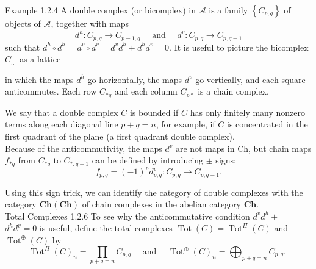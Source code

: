 Example 1.2.4 A double complex (or bicomplex) in $\mathcal{A}$ is a family $\left\{C_{p, q}\right\}$ of objects of $\mathcal{A}$, together with maps
$$
d^h: C_{p, q} \rightarrow C_{p-1, q} \quad \text { and } \quad d^v: C_{p, q} \rightarrow C_{p, q-1}
$$
such that $d^h \circ d^h=d^v \circ d^v=d^v d^h+d^h d^v=0$. It is useful to picture the bicomplex $C_{\text {.. }}$ as a lattice 
    in which the maps $d^h$ go horizontally, the maps $d^v$ go vertically, and each square anticommutes. Each row $C_{* q}$ and each column $C_{p *}$ is a chain complex.

We say that a double complex $C$ is bounded if $C$ has only finitely many nonzero terms along each diagonal line $p+q=n$, for example, if $C$ is concentrated in the first quadrant of the plane (a first quadrant double complex).\\
Because of the anticommutivity, the maps $d^v$ are not maps in Ch, but chain maps $f_{* q}$ from $C_{* q}$ to $C_{*, q-1}$ can be defined by introducing $\pm$ signs:
$$
f_{p, q}=(-1)^p d_{p, q}^v: C_{p, q} \rightarrow C_{p, q-1} .
$$

Using this sign trick, we can identify the category of double complexes with the category $\mathbf{C h}(\mathbf{C h})$ of chain complexes in the abelian category $\mathbf{C h}$.\\
Total Complexes 1.2.6 To see why the anticommutative condition $d^v d^h+$ $d^h d^v=0$ is useful, define the total complexes $\operatorname{Tot}(C)=\operatorname{Tot}^{\Pi}(C)$ and $\operatorname{Tot}^{\oplus}(C)$ by
$$
\operatorname{Tot}^{\Pi}(C)_n=\prod_{p+q=n} C_{p, q} \quad \text { and } \quad \operatorname{Tot}^{\oplus}(C)_n=\bigoplus_{p+q=n} C_{p, q} \text {. }
$$


